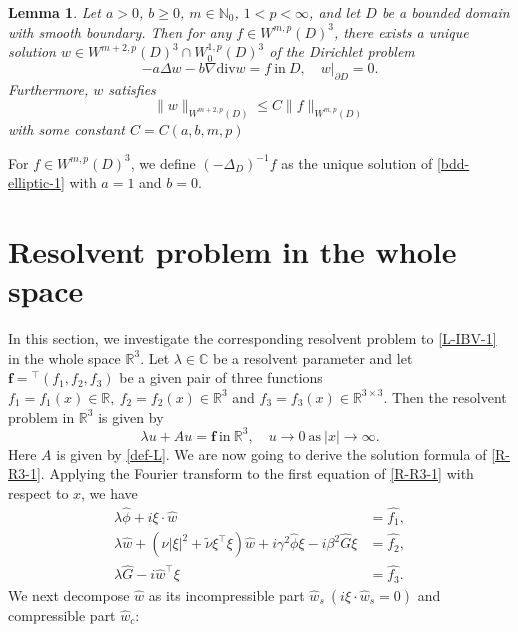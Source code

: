 \documentclass[dvipdfmx,12pt]{article}
\newtheorem{lem}[dfn]{Lemma}
\begin{document}
\begin{lem} \label{bdd-elliptic}
Let $a>0$, $b\ge0$, $m\in \mathbb{N}_0$, $1<p<\infty$, and let $D$ be a bounded domain with smooth boundary. Then for any $f\in W^{m,p}(D)^3$, there exists a unique solution $w\in W^{m+2,p}(D)^3\cap W_0^{1,p}(D)^3$ of the Dirichlet problem
\begin{equation}
-a\Delta w-b\nabla \mathrm{div}w=f~\textrm{in}~D,\quad w|_{\partial D}=0. \label{bdd-elliptic-1}
\end{equation}
Furthermore, $w$ satisfies 
\[
\|w\|_{W^{m+2,p}(D)}\leq C\|f\|_{W^{m,p}(D)}
\]
with some constant $C=C(a,b,m,p)$
\end{lem}
For $f\in W^{m,p}(D)^3$, we define $(-\Delta_D)^{-1}f$ as the unique solution of \eqref{bdd-elliptic-1} with $a=1$ and $b=0$.

\section{Resolvent problem in the whole space} 
In this section, we investigate the corresponding resolvent problem to \eqref{L-IBV-1} in the whole space $\mathbb{R}^3$. Let $\lambda\in\mathbb{C}$ be a resolvent parameter and let $\mathbf{f}={}^\top(f_1,f_2,f_3)$ be a given pair of three functions $f_1=f_1(x)\in\mathbb{R},~f_2=f_2(x)\in\mathbb{R}^3$ and $f_3=f_3(x)\in\mathbb{R}^{3\times3}$. Then the resolvent problem in $\mathbb{R}^3$ is given by
\begin{equation}
\label{R-R3-1}
\lambda u+Au=\mathbf{f}~\mathrm{in}~\mathbb{R}^3, \quad
u\to 0~\textrm{as}~|x|\to\infty.
\end{equation}
Here $A$ is given by \eqref{def-L}. We are now going to derive the solution formula of \eqref{R-R3-1}. Applying the Fourier transform to the first equation of \eqref{R-R3-1} with respect to $x$, we have
\begin{equation}
\label{R-R3-1-1}
\begin{aligned}
\lambda \widehat{\phi}+i\xi\cdot\widehat{w}&=\widehat{f_1}, \\
\lambda \widehat{w}+(\nu|\xi|^2+\tilde{\nu}\xi^\top\xi)\widehat{w}+i\gamma^2\widehat{\phi}\xi-i\beta^2\widehat{G}\xi&=\widehat{f_2}, \\
\lambda \widehat{G}-i\widehat{w}^\top\xi&=\widehat{f_3}. 
\end{aligned}
\end{equation} 
We next decompose $\widehat{w}$ as its incompressible part $\widehat{w}_s~(i\xi\cdot\widehat{w}_s=0)$ and compressible part $\widehat{w}_c$:
\end{document}
